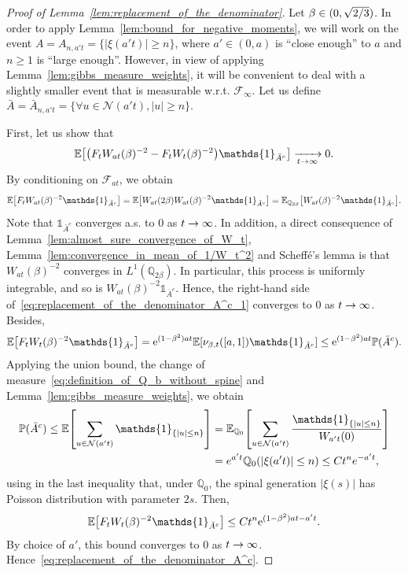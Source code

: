 \documentclass[10pt]{amsart}
\theoremstyle{definition}\newtheorem{defi}[theo]{Definition}\newtheorem{rema}[theo]{Remark}\newtheorem{exam}[theo]{Example}\newtheorem{exem}[theo]{Example}\newtheorem{nota}[theo]{Notation}
\newcommand{\e}{\mathrm{e}}
\newcommand{\E}{\mathbb{E}}
\renewcommand{\P}{\mathbb{P}}
\newcommand{\Q}{\mathbb{Q}}
\newcommand\1{\mathds{1}}
\newcommand{\cF}{\mathcal{F}}
\newcommand{\cN}{\mathcal{N}}
\newcommand{\Expec}[1]{\mathbb{E}\left[#1\right]}
\let\oldforall\forall
\renewcommand*{\forall}{\mathrel{\oldforall}}
\let\originalleft\left
\let\originalright\right
\renewcommand{\left}{\mathopen{}\mathclose\bgroup\originalleft}
\renewcommand{\right}{\aftergroup\egroup\originalright}
\renewcommand*{\to}{\mathchoice{\longrightarrow}{\rightarrow}{\rightarrow}{\rightarrow}}
\begin{document}
\begin{proof}[Proof of Lemma~\ref{lem:replacement_of_the_denominator}]
Let $\beta \in (0, \sqrt{2\smash{/}3})$. In order to apply Lemma~\ref{lem:bound_for_negative_moments}, we will work on the event $A = A_{n, a't} = \{|\xi(a't)| \geq n\}$, where $a' \in (0, a)$ is ``close enough'' to $a$ and $n \geq 1$ is ``large enough''. However, in view of applying Lemma~\ref{lem:gibbs_measure_weights}, it will be convenient to deal with a slightly smaller event that is measurable w.r.t. $\cF_\infty$. Let us define $\bar{A} = \bar{A}_{n, a't} = \{\forall u \in \cN(a't), |u| \geq n\}$.

First, let us show that
\begin{equation}\label{eq:replacement_of_the_denominator_A^c}
\E \left[\left(F_t W_{at}(\beta)^{-2} - F_t W_t(\beta)^{-2}\right) \1_{\bar{A}^c} \right] \xrightarrow[t \to \infty]{} 0.
\end{equation}
By conditioning on $\cF_{at}$, we obtain
\begin{equation}\label{eq:replacement_of_the_denominator_A^c_1}
\E\left[F_t W_{at}(\beta)^{-2} \1_{\bar{A}^c}\right] = \E\left[W_{at}(2\beta) W_{at}(\beta)^{-2} \1_{\bar{A}^c}\right] = \E_{\Q_{2\beta}}\left[W_{at}(\beta)^{-2} \1_{\bar{A}^c}\right].
\end{equation}
Note that $\1_{\bar{A}^c}$ converges a.s. to $0$ as $t \to\infty$. In addition, a direct consequence of Lemma~\ref{lem:almost_sure_convergence_of_W_t}, Lemma~\ref{lem:convergence_in_mean_of_1/W_t^2} and Scheffé's lemma is that $W_{at}(\beta)^{-2}$ converges in $L^1(\Q_{2\beta})$. In particular, this process is uniformly integrable, and so is $W_{at}(\beta)^{-2} \1_{\bar{A}^c}$. Hence, the right-hand side of~\eqref{eq:replacement_of_the_denominator_A^c_1} converges to $0$ as $t \to \infty$. Besides,
\begin{equation*}
\E\left[F_t W_t(\beta)^{-2} \1_{\bar{A}^c}\right] = \e^{(1 - \beta^2)at} \E \left[\nu_{\beta, t}([a, 1]) \1_{\bar{A}^c} \right] \leq \e^{(1 - \beta^2)at} \P(\bar{A}^c).
\end{equation*}
Applying the union bound, the change of measure~\eqref{eq:definition_of_Q_b_without_spine} and Lemma~\ref{lem:gibbs_measure_weights}, we obtain
\begin{equation}\label{eq:probability_of_Ac}
\begin{aligned}[t]
\P(\bar{A}^c)  \leq \Expec{\sum_{u\in\cN(a't)} \1_{\{|u| \leq n\}}} &= \E_{\Q_0} \left[\sum_{u \in \cN(a't)} \frac{ \1_{\{|u| \leq n\}}}{W_{a't}(0)} \right] \\
 &= e^{a't} \Q_0\left(|\xi(a't)| \leq n\right)
 \leq C t^n e^{-a' t},
\end{aligned}
\end{equation}
using in the last inequality that, under $\Q_0$, the spinal generation $|\xi(s)|$ has Poisson distribution with parameter $2s$. Then,
\begin{equation}\label{eq:replacement_of_the_denominator_A^c_bound}
\E\left[F_t W_t(\beta)^{-2} \1_{\bar{A}^c}\right] \leq C t^n \e^{(1 - \beta^2)at - a't}.
\end{equation}
By choice of $a'$, this bound converges to $0$ as $t \to \infty$. Hence~\eqref{eq:replacement_of_the_denominator_A^c}.


\end{proof}
\end{document}
